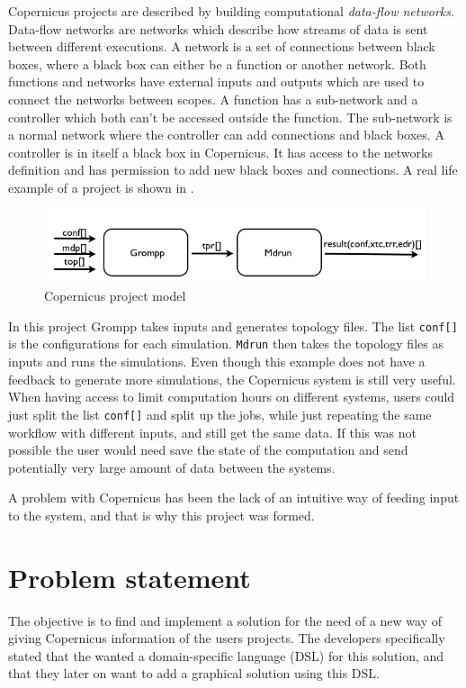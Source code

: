 Copernicus projects are described by building computational
\emph{data-flow networks}. Data-flow networks are networks which
describe how streams of data is sent between different executions.  A
network is a set of connections between black boxes, where a black box
can either be a function or another network. Both functions and
networks have external inputs and outputs which are used to connect
the networks between scopes. A function has a sub-network and a
controller which both can't be accessed outside the function. The
sub-network is a normal network where the controller can add
connections and black boxes. A controller is in itself a black box in
Copernicus. It has access to the networks definition and has
permission to add new black boxes and connections. A real life example
of a project is shown in .

\begin{figure}[H]
  \centering
  \includegraphics[scale=0.4]{Chapters/IntroductionIncludes/example.png}
  \caption{Copernicus project model}
  \label{fig:cpcprojectmodel}
\end{figure}

In this project Grompp takes inputs and generates topology files. The
list \verb#conf[]# is the configurations for each
simulation. \verb#Mdrun# then takes the topology files as inputs and
runs the simulations. Even though this example does not have a
feedback to generate more simulations, the Copernicus system is still
very useful. When having access to limit computation hours on
different systems, users could just split the list \verb#conf[]# and
split up the jobs, while just repeating the same workflow with
different inputs, and still get the same data. If this was not
possible the user would need save the state of the computation and
send potentially very large amount of data between the systems.


A problem with Copernicus has been the lack of an intuitive way of
feeding input to the system, and that is why this project was formed.


\section{Problem statement}
The objective is to find and implement a solution for the need of a
new way of giving Copernicus information of the users projects. The
developers specifically stated that the wanted a domain-specific
language (DSL) for this solution, and that they later on want to add a
graphical solution using this DSL.

